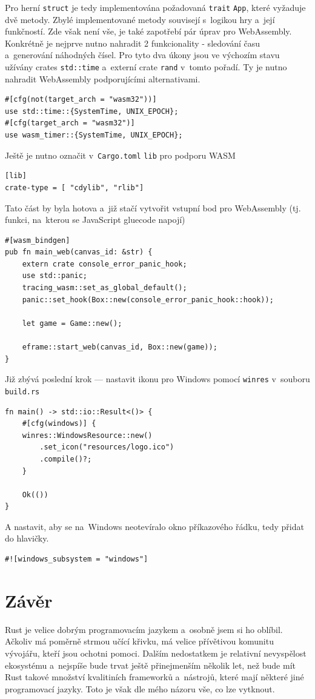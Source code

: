 \documentclass[a4paper, 12pt, twoside]{article} %
\newcommand{\rust}[1]{\texttt{#1}}
\begin{document}
		Pro herní \texttt{struct} je tedy implementována požadovaná \rust{trait} \rust{App}, které vyžaduje dvě metody. Zbylé implementované metody souvisejí s~logikou hry a~její funkčností. Zde však není vše, je také zapotřebí pár úprav pro WebAssembly. Konkrétně je nejprve nutno nahradit 2 funkcionality - sledování času a~generování náhodných čísel. Pro tyto dva úkony jsou ve výchozím stavu užívány crates \rust{std::time} a~externí crate \rust{rand} v~tomto pořadí. Ty je nutno nahradit WebAssembly podporujícími alternativami.
		\begin{verbatim}
#[cfg(not(target_arch = "wasm32"))]
use std::time::{SystemTime, UNIX_EPOCH};
#[cfg(target_arch = "wasm32")]
use wasm_timer::{SystemTime, UNIX_EPOCH};
		\end{verbatim}
		
		Ještě je nutno označit v~\texttt{Cargo.toml} \texttt{lib} pro podporu WASM
		\begin{verbatim}
[lib]
crate-type = [ "cdylib", "rlib"]
		\end{verbatim}
		
		Tato část by byla hotova a~již stačí vytvořit vstupní bod pro WebAssembly (tj. funkci, na~kterou se JavaScript gluecode napojí)
		\begin{verbatim}
#[wasm_bindgen]
pub fn main_web(canvas_id: &str) {
    extern crate console_error_panic_hook;
    use std::panic;
    tracing_wasm::set_as_global_default();
    panic::set_hook(Box::new(console_error_panic_hook::hook));

    let game = Game::new();

    eframe::start_web(canvas_id, Box::new(game));
}
		\end{verbatim}
		
		Již zbývá poslední krok — nastavit ikonu pro Windows pomocí \rust{winres} v~souboru \texttt{build.rs}
		\begin{verbatim}
fn main() -> std::io::Result<()> {
	#[cfg(windows)] {
	winres::WindowsResource::new()
		.set_icon("resources/logo.ico")
		.compile()?;
	}

	Ok(())
}
		\end{verbatim}
		
		A nastavit, aby se na~Windows neotevíralo okno příkazového řádku, tedy přidat do hlavičky.
		\begin{verbatim}
#![windows_subsystem = "windows"]
		\end{verbatim}

\section{Závěr}
	Rust je velice dobrým programovacím jazykem a~osobně jsem si ho oblíbil. Ačkoliv má poměrně strmou učící křivku, má velice přívětivou komunitu vývojářu, kteří jsou ochotni pomoci. Dalším nedostatkem je relativní nevyspělost ekosystému a~nejspíše bude trvat ještě přinejmenším několik let, než bude mít Rust takové množství kvalitiních frameworků a~nástrojů, které mají některé jiné programovací jazyky. Toto je však dle mého názoru vše, co lze vytknout.
	
\end{document}
